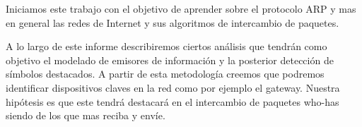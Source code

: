 
Iniciamos este trabajo con el objetivo de aprender sobre el protocolo ARP y mas en general las redes de Internet y sus algoritmos de intercambio de paquetes.

A lo largo de este informe describiremos ciertos análisis que tendrán como objetivo el modelado de emisores de información y la posterior detección de símbolos destacados. A partir de esta metodología creemos que podremos identificar dispositivos claves en la red como por ejemplo el gateway. Nuestra hipótesis es que este tendrá destacará en el intercambio de paquetes who-has siendo de los que mas reciba y envíe.